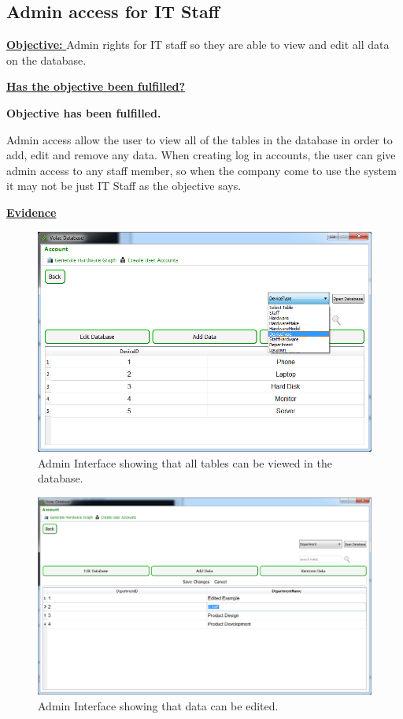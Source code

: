 \subsection{Admin access for IT Staff}\label{admin}

\underline{\textbf{Objective:} } Admin rights for IT staff so they are able to view and edit all data on the database.

\underline{\textbf{Has the objective been fulfilled?}}

\textbf{Objective has been fulfilled.}

Admin access allow the user to  view all of the tables in the database in order to add, edit and remove any data. When creating log in accounts, the user can give admin access to any staff member, so when the company come to use the system it may not be just IT Staff as the objective says.

\underline{\textbf{Evidence}}

\begin{figure}[H]
    \includegraphics[width=\textwidth]{./Evaluation/Images/admin1.png}
    \caption{Admin Interface showing that all tables can be viewed in the database.} 
\end{figure}

\begin{figure}[H]
    \includegraphics[width=\textwidth]{./Evaluation/Images/admin2.png}
    \caption{Admin Interface showing that data can be edited.} 
\end{figure}

